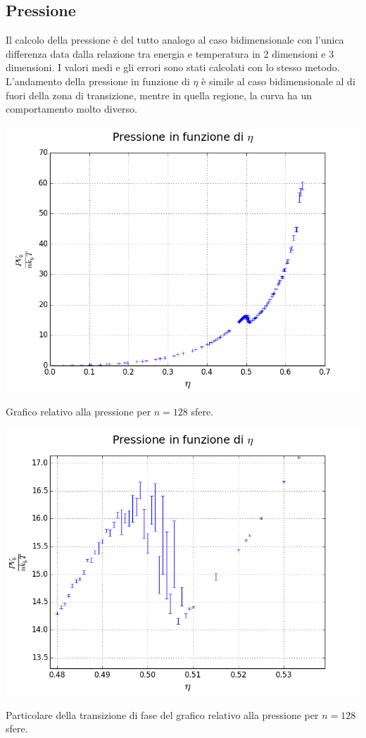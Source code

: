 \subsection{Pressione}
Il calcolo della pressione è del tutto analogo al caso bidimensionale con l'unica differenza data dalla relazione tra energia e temperatura in 2 dimensioni e 3 dimensioni. I valori medi e gli errori sono stati calcolati con lo stesso metodo.\\
L'andamento della pressione in funzione di $\eta$ è simile al caso bidimensionale al di fuori della zona di transizione, mentre in quella regione, la curva ha un comportamento molto diverso.
\begin{myfig}[h]
	\includegraphics[scale=0.5]{sfere3D/pressione.png}
	\caption{Grafico relativo alla pressione per $n=128$ sfere.}
\end{myfig}
\begin{myfig}[h]
	\includegraphics[scale=0.5]{sfere3D/pressionezoomzoom.png}
	\caption{Particolare della transizione di fase del grafico relativo alla pressione per $n=128$ sfere.}
\end{myfig}


